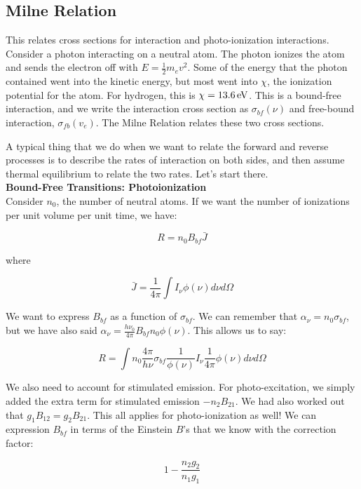 \documentclass{article}
\newcommand{\unit}[1]{{\,\rm #1}}
\newcommand{\ev}{\unit{eV}}
\begin{document}
\subsection{Milne Relation}

\def\sigbf{\sigma_{bf}}
\def\sigfb{\sigma_{fb}}

This relates cross sections for interaction and photo-ionization interactions. Consider a photon interacting on a neutral atom. The photon ionizes the atom and sends the electron off with $E = \frac12 m_e v^2$. Some of the energy that the photon contained went into the kinetic energy, but most went into $\chi$, the ionization potential for the atom. For hydrogen, this is $\chi = 13.6 \ev$. This is a bound-free interaction, and we write the interaction cross section as $\sigbf(\nu)$ and free-bound interaction, $\sigfb(v_e)$. The Milne Relation relates these two cross sections.

A typical thing that we do when we want to relate the forward and reverse processes is to describe the rates of interaction on both sides, and then assume thermal equilibrium to relate the two rates. Let's start there. \\



\textbf{Bound-Free Transitions: Photoionization}\\

Consider $n_0$, the number of neutral atoms. If we want the number of ionizations per unit volume per unit time, we have:

$$
R = n_0 B_{bf} \bar{J}
$$

where 

$$
\bar{J} = \frac{1}{4\pi} \int I_\nu \phi(\nu) d\nu d\Omega 
$$

We want to express $B_{bf}$ as a function of $\sigbf$. We can remember that $\alpha_\nu = n_0 \sigbf$, but we have also said $\alpha_\nu = \frac{h\nu_0}{4\pi}B_{bf} n_0 \phi(\nu)$. This allows us to say:

$$
R = \int n_0 \frac{4\pi}{h\nu} \sigbf \frac{1}{\phi(\nu)} I_\nu \frac{1}{4\pi} \phi(\nu) d\nu d\Omega
$$

We also need to account for stimulated emission. For photo-excitation, we simply added the extra term for stimulated emission $-n_2 B_{21}$. We had also worked out that $g_1 B_{12} = g_2 B_{21}$. This all applies for photo-ionization as well! We can expression $B_{bf}$ in terms of the Einstein $B$'s that we know with the correction factor:

$$
1 - \frac{n_2 g_2}{n_1 g_1}
$$
\end{document}
